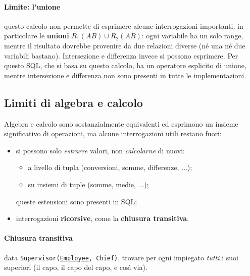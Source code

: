 \documentclass[a4paper,12pt]{article}
\begin{document}
\paragraph{Limite: l'unione} questo calcolo non permette di esprimere alcune
interrogazioni importanti, in particolare le \textbf{unioni}
$R_1(AB) \cup R_2(AB)$: ogni variabile ha un solo range, mentre il risultato
dovrebbe provenire da due relazioni diverse (né una né due variabili bastano).
Intersezione e differenza invece si possono esprimere. Per questo SQL, che si
basa su questo calcolo, ha un operatore esplicito di unione, mentre
intersezione e differenza non sono presenti in tutte le implementazioni.

\subsection{Limiti di algebra e calcolo}

Algebra e calcolo sono sostanzialmente equivalenti ed esprimono un insieme
significativo di operazioni, ma alcune interrogazioni utili restano fuori:
\begin{itemize}
  \item si possono solo \emph{estrarre} valori, non \emph{calcolarne} di nuovi:
    \begin{itemize}
      \item a livello di tupla (conversioni, somme, differenze, $\ldots$);
      \item su insiemi di tuple (somme, medie, $\ldots$);
    \end{itemize}
    queste estensioni sono presenti in SQL;
  \item interrogazioni \textbf{ricorsive}, come la \textbf{chiusura
    transitiva}.
\end{itemize}

\paragraph{Chiusura transitiva} data
\texttt{Supervisor(\underline{Employee}, Chief)}, trovare per ogni impiegato
\emph{tutti} i suoi superiori (il capo, il capo del capo, e così via).
\end{document}
